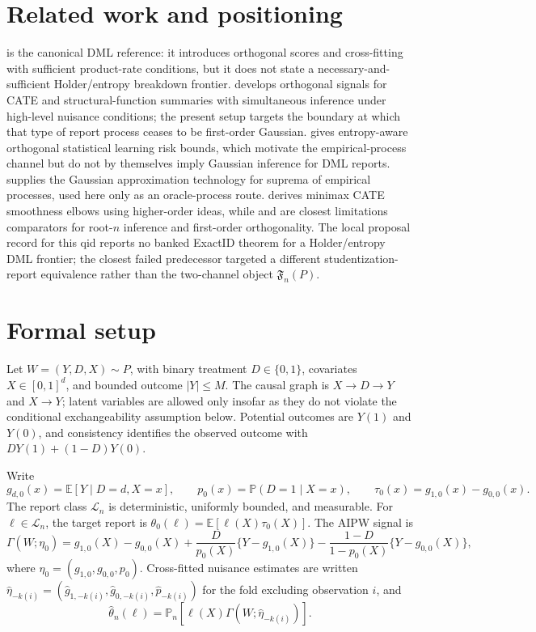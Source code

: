 \documentclass[11pt]{article}
\newcommand{\E}{\mathbb{E}}
\renewcommand{\Pr}{\mathbb{P}}
\theoremstyle{definition}
\theoremstyle{plain}
\theoremstyle{remark}
\begin{document}
\section{Related work and positioning}
\cite{ChernozhukovEtAl2018DML} is the canonical DML reference: it introduces
orthogonal scores and cross-fitting with sufficient product-rate conditions,
but it does not state a necessary-and-sufficient Holder/entropy breakdown
frontier.  \cite{SemenovaChernozhukov2021DMLCATE} develops orthogonal signals
for CATE and structural-function summaries with simultaneous inference under
high-level nuisance conditions; the present setup targets the boundary at
which that type of report process ceases to be first-order Gaussian.
\cite{FosterSyrgkanis2023OSL} gives entropy-aware orthogonal statistical
learning risk bounds, which motivate the empirical-process channel but do not
by themselves imply Gaussian inference for DML reports.
\cite{ChernozhukovChetverikovKato2014Gaussian} supplies the Gaussian
approximation technology for suprema of empirical processes, used here only as
an oracle-process route.  \cite{KennedyBalakrishnanRobinsWasserman2024MinimaxCATE}
derives minimax CATE smoothness elbows using higher-order ideas, while
\cite{ArmstrongKolesar2021FiniteSampleATE} and
\cite{MackeySyrgkanisZadik2018OML} are closest limitations comparators for
root-\(n\) inference and first-order orthogonality.  The local proposal record
for this qid reports no banked ExactID theorem for a Holder/entropy DML
frontier; the closest failed predecessor targeted a different
studentization-report equivalence rather than the two-channel object
\(\mathfrak{F}_n(P)\).

\section{Formal setup}
Let \(W=(Y,D,X)\sim P\), with binary treatment \(D\in\{0,1\}\), covariates
 \(X\in[0,1]^d\), and bounded outcome \(|Y|\le M\).  The causal graph is
 \(X\to D\to Y\) and \(X\to Y\); latent variables are allowed only insofar as
 they do not violate the conditional exchangeability assumption below.
 Potential outcomes are \(Y(1)\) and \(Y(0)\), and consistency identifies the
 observed outcome with \(DY(1)+(1-D)Y(0)\).

Write
\[
g_{d,0}(x)=\E[Y\mid D=d,X=x],\qquad
p_0(x)=\Pr(D=1\mid X=x),\qquad
\tau_0(x)=g_{1,0}(x)-g_{0,0}(x).
\]
The report class \(\mathcal{L}_n\) is deterministic, uniformly bounded, and
measurable.  For \(\ell\in\mathcal{L}_n\), the target report is
\(\theta_0(\ell)=\E[\ell(X)\tau_0(X)]\).  The AIPW signal is
\[
\Gamma(W;\eta_0)=g_{1,0}(X)-g_{0,0}(X)
+\frac{D}{p_0(X)}\{Y-g_{1,0}(X)\}
-\frac{1-D}{1-p_0(X)}\{Y-g_{0,0}(X)\},
\]
where \(\eta_0=(g_{1,0},g_{0,0},p_0)\).  Cross-fitted nuisance estimates are
written \(\hat\eta_{-k(i)}=(\hat g_{1,-k(i)},\hat g_{0,-k(i)},\hat p_{-k(i)})\)
for the fold excluding observation \(i\), and
\[
\hat\theta_n(\ell)=\mathbb{P}_n[\ell(X)\Gamma(W;\hat\eta_{-k(i)})].
\]
\end{document}
